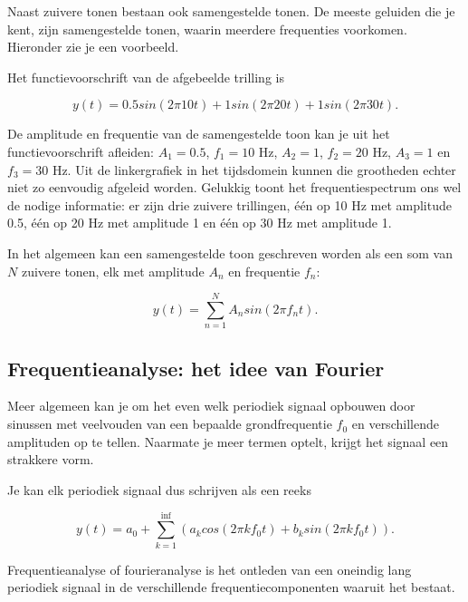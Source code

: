 Naast zuivere tonen bestaan ook samengestelde tonen. De meeste geluiden die je kent, zijn samengestelde tonen, waarin meerdere frequenties voorkomen. Hieronder zie je een voorbeeld.


Het functievoorschrift van de afgebeelde trilling is 

\begin{equation*}
y(t) = 0.5 sin(2 \pi 10 t) + 1 sin(2 \pi 20 t) + 1 sin(2 \pi 30 t).
\end{equation*}

De amplitude en frequentie van de samengestelde toon kan je uit het functievoorschrift afleiden: $A_1 = 0.5$, $f_1 = 10$ Hz, $A_2 = 1$, $f_2 = 20$ Hz, $A_3 = 1$ en $f_3 = 30$ Hz. Uit de linkergrafiek in het tijdsdomein kunnen die grootheden echter niet zo eenvoudig afgeleid worden. Gelukkig toont het frequentiespectrum ons wel de nodige informatie: er zijn drie zuivere trillingen, \'e\'en op 10 Hz met amplitude 0.5, \'e\'en op 20 Hz met amplitude 1 en \'e\'en op 30 Hz met amplitude 1.

In het algemeen kan een samengestelde toon geschreven worden als een som van $N$ zuivere tonen, elk met amplitude $A_n$ en frequentie $f_n$:

\begin{equation*}
y(t) = \sum_{n=1}^{N} A_n sin(2 \pi f_n t).
\end{equation*}

\subsection{Frequentieanalyse: het idee van Fourier}

Meer algemeen kan je om het even welk periodiek signaal opbouwen door sinussen met veelvouden van een bepaalde grondfrequentie $f_0$ en verschillende amplituden op te tellen. Naarmate je meer termen optelt, krijgt het signaal een strakkere vorm.

Je kan elk periodiek signaal dus schrijven als een reeks

\begin{equation*}
y(t) = a_0 + \sum_{k=1}^{\inf} (a_k cos(2 \pi k f_0 t) + b_k sin(2 \pi k f_0 t)).
\end{equation*}

Frequentieanalyse of fourieranalyse is het ontleden van een oneindig lang periodiek signaal in de verschillende frequentiecomponenten waaruit het bestaat. 

